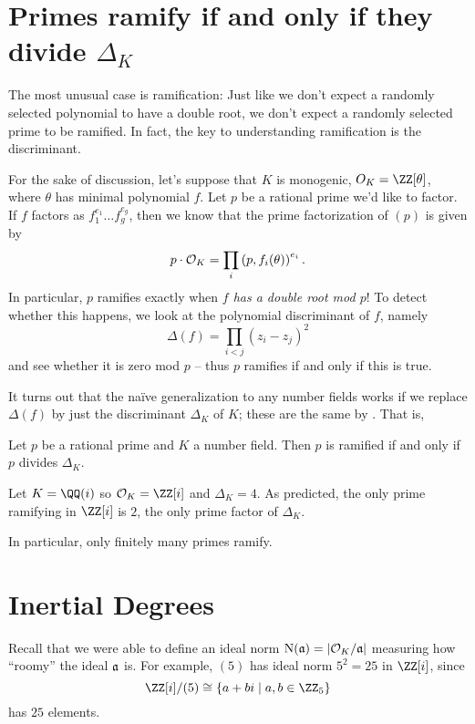 \section{Primes ramify if and only if they divide $\Delta_K$}
The most unusual case is ramification:
Just like we don't expect a randomly selected polynomial to have a double root,
we don't expect a randomly selected prime to be ramified.
In fact, the key to understanding ramification is the discriminant.

For the sake of discussion, let's suppose that $K$ is monogenic, $O_K = \ZZ[\theta]$,
where $\theta$ has minimal polynomial $f$.
Let $p$ be a rational prime we'd like to factor.
If $f$ factors as $f_1^{e_1} \dots f_g^{e_g}$, then we know that
the prime factorization of $(p)$ is given by
\[ p \cdot \OO_K = \prod_i \left( p, f_i(\theta) \right)^{e_i}. \]
In particular, $p$ ramifies exactly when \emph{$f$ has a double root mod $p$}!
To detect whether this happens, we look at the polynomial discriminant of $f$,
namely
\[ \Delta(f) = \prod_{i<j} (z_i - z_j)^2 \]
and see whether it is zero mod $p$ -- thus $p$ ramifies if and only if this is true.

It turns out that the na\"ive generalization to any number fields
works if we replace $\Delta(f)$ by just the discriminant $\Delta_K$ of $K$;
these are the same by .
That is,
\begin{theorem}
	Let $p$ be a rational prime and $K$ a number field.
	Then $p$ is ramified if and only if $p$ divides $\Delta_K$.
\end{theorem}
\begin{example}
	Let $K = \QQ(i)$ so $\OO_K = \ZZ[i]$ and $\Delta_K = 4$.
	As predicted, the only prime ramifying in $\ZZ[i]$ is $2$,
	the only prime factor of $\Delta_K$.
\end{example}
In particular, only finitely many primes ramify.

\section{Inertial Degrees}

Recall that we were able to define an ideal norm $\Norm(\aa) = \left\lvert \OO_K / \aa \right\rvert$
measuring how ``roomy'' the ideal $\aa$ is.
For example, $(5)$ has ideal norm $5^2 = 25$ in $\ZZ[i]$, since
\[ \ZZ[i] / (5) \cong \left\{ a+bi \mid a,b \in \ZZ_5 \right\} \]
has $25$ elements.

